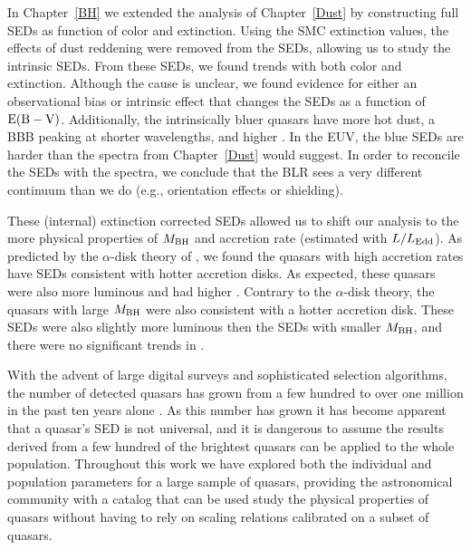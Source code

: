 In Chapter~\ref{BH} we extended the analysis of Chapter~\ref{Dust} by constructing full SEDs as function of color and extinction.
Using the SMC extinction values, the effects of dust reddening were removed from the SEDs, allowing us to study the intrinsic SEDs.  From these SEDs, we found trends with both color and extinction.  
Although the cause is unclear, we found evidence for either an observational bias or intrinsic effect that changes the SEDs as a function of ${\rm E(B-V)}$.
Additionally, the intrinsically bluer quasars have more hot dust, a BBB peaking at shorter wavelengths, and higher \bctwofive.  
In the EUV, the blue SEDs are harder than the spectra from Chapter~\ref{Dust} would suggest.
In order to reconcile the SEDs with the spectra, we conclude that the BLR sees a very different continuum than we do (e.g., orientation effects or shielding).  

These (internal) extinction corrected SEDs allowed us to shift our analysis to the more physical properties of $M_{\rm BH}$ and accretion rate (estimated with $L/L_{\rm Edd}$).  
As predicted by the $\alpha$-disk theory of \citet{Shakura:1973}, we found the quasars with high accretion rates have SEDs consistent with hotter accretion disks.  As expected, these quasars were also more luminous and had higher \bctwofive.  Contrary to the $\alpha$-disk theory, the quasars with large $M_{\rm BH}$ were also consistent with a hotter accretion disk.  These SEDs were also slightly more luminous then the SEDs with smaller $M_{\rm BH}$, and there were no significant trends in \bctwofive.

With the advent of large digital surveys and sophisticated selection algorithms, the number of detected quasars has grown from a few hundred to over one million in the past ten years alone \citep{Richards:2009}.  As this number has grown it has become apparent that a quasar's SED is not universal, and it is dangerous to assume the results derived from a few hundred of the brightest quasars can be applied to the whole population.  Throughout this work we have explored both the individual and population parameters for a large sample of quasars, providing the astronomical community with a catalog that can be used study the physical properties of quasars without having to rely on scaling relations calibrated on a subset of quasars.